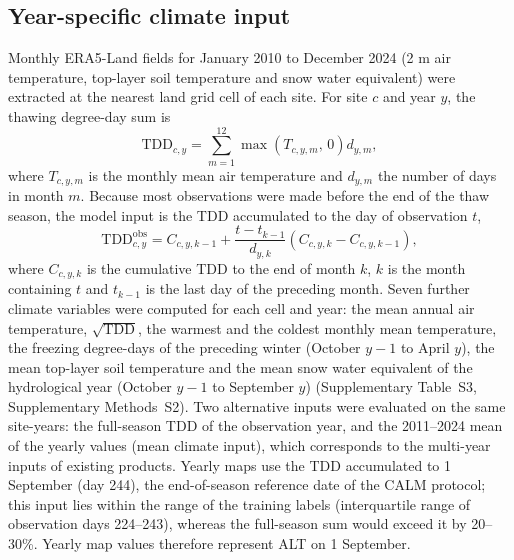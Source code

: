 


\subsection{Year-specific climate input}
Monthly ERA5-Land fields for January 2010 to December 2024\cite{munozsabater2021_era5_land} (2 m air temperature, top-layer soil temperature and snow water equivalent) were extracted at the nearest land grid cell of each site. For site $c$ and year $y$, the thawing degree-day sum is
\begin{equation}
\mathrm{TDD}_{c,y} = \sum_{m=1}^{12} \max\!\left(T_{c,y,m},\,0\right) d_{y,m},
\label{eq:tdd}
\end{equation}
where $T_{c,y,m}$ is the monthly mean air temperature and $d_{y,m}$ the number of days in month $m$. Because most observations were made before the end of the thaw season, the model input is the TDD accumulated to the day of observation $t$,
\begin{equation}
\mathrm{TDD}^{\mathrm{obs}}_{c,y} = C_{c,y,k-1} + \frac{t - t_{k-1}}{d_{y,k}} \left( C_{c,y,k} - C_{c,y,k-1} \right),
\label{eq:tddobs}
\end{equation}
where $C_{c,y,k}$ is the cumulative TDD to the end of month $k$, $k$ is the month containing $t$ and $t_{k-1}$ is the last day of the preceding month. Seven further climate variables were computed for each cell and year: the mean annual air temperature, $\sqrt{\mathrm{TDD}}$, the warmest and the coldest monthly mean temperature, the freezing degree-days of the preceding winter (October $y-1$ to April $y$), the mean top-layer soil temperature and the mean snow water equivalent of the hydrological year (October $y-1$ to September $y$) (Supplementary Table~S3, Supplementary Methods~S2). Two alternative inputs were evaluated on the same site-years: the full-season TDD of the observation year, and the 2011--2024 mean of the yearly values (mean climate input), which corresponds to the multi-year inputs of existing products. Yearly maps use the TDD accumulated to 1 September (day 244), the end-of-season reference date of the CALM protocol; this input lies within the range of the training labels (interquartile range of observation days 224--243), whereas the full-season sum would exceed it by 20--30\%. Yearly map values therefore represent ALT on 1 September.

